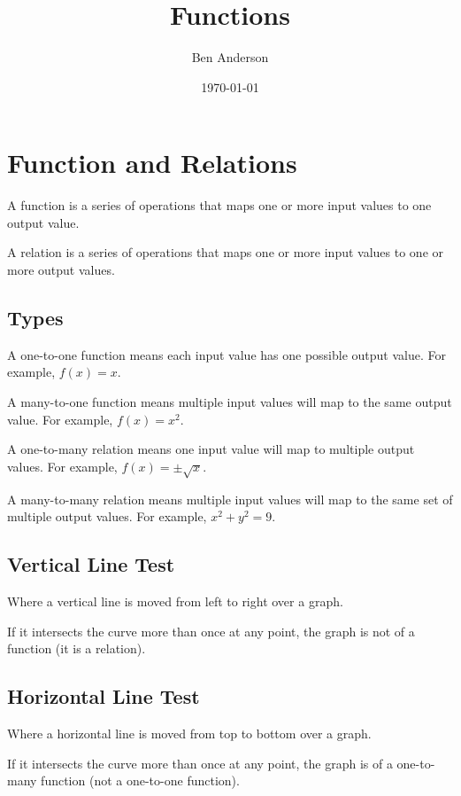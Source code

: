 \documentclass[a4paper,11pt]{article}
\begin{document}
\title{Functions}
\author{Ben Anderson}
\date{\today}
\maketitle
\pagebreak

\tableofcontents
\pagebreak


\section{Function and Relations}

A function is a series of operations that maps one or more input values to one
output value.

A relation is a series of operations that maps one or more input values to one
or more output values.


\subsection{Types}

A one-to-one function means each input value has one possible output value.
For example, $f(x) = x$.

A many-to-one function means multiple input values will map to the same output
value. For example, $f(x) = x^2$.

A one-to-many relation means one input value will map to multiple output values.
For example, $f(x) = \pm \sqrt{x}$.

A many-to-many relation means multiple input values will map to the same set of
multiple output values. For example, $x^2 + y^2 = 9$.


\subsection{Vertical Line Test}

Where a vertical line is moved from left to right over a graph.

If it intersects the curve more than once at any point, the graph is not of a
function (it is a relation).


\subsection{Horizontal Line Test}

Where a horizontal line is moved from top to bottom over a graph.

If it intersects the curve more than once at any point, the graph is of a
one-to-many function (not a one-to-one function).
\end{document}
